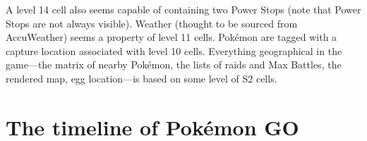 A level 14 cell also seems capable of containing two Power Stops (note that Power Stops are not always visible).
 Weather (thought to be sourced from AccuWeather) seems a property of level 11 cells.
Pokémon are tagged with a capture location associated with level 10 cells.
Everything geographical in the game---the matrix of nearby Pokémon, the lists
 of raids and Max Battles, the rendered map, egg location---is based on some level of S2 cells.

\section{The timeline of Pokémon GO\label{sec:timeline}}
